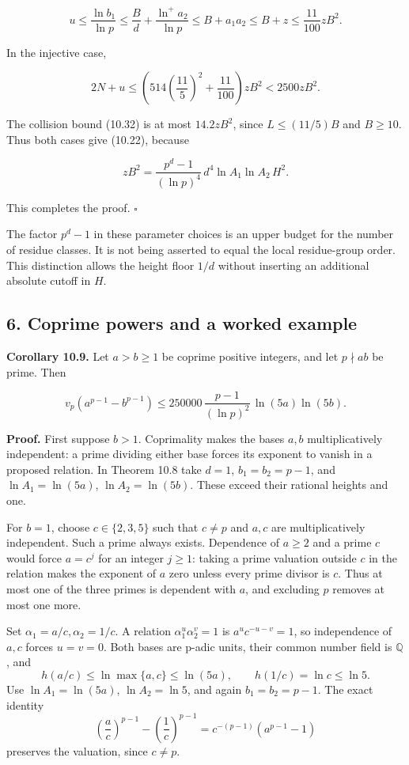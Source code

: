 \documentclass[
  11pt,
  a4paper,
]{article}
\begin{document}
\[
u\le\frac{\ln b_1}{\ln p}
\le\frac Bd+\frac{\ln^+a_2}{\ln p}
\le B+a_1a_2\le B+z
\le\frac{11}{100}zB^2.
\tag{10.33}
\]

In the injective case,

\[
2N+u\le\left(514\left(\frac{11}{5}\right)^2+\frac{11}{100}\right)zB^2
<2500zB^2.
\]

The collision bound (10.32) is at most \(14.2zB^2\), since
\(L\le(11/5)B\) and \(B\ge10\). Thus both cases give (10.22), because

\[
zB^2=\frac{p^d-1}{(\ln p)^4}\,d^4\ln A_1\ln A_2\,H^2.
\]

This completes the proof. \(\square\)

The factor \(p^d-1\) in these parameter choices is an upper budget for
the number of residue classes. It is not being asserted to equal the
local residue-group order. This distinction allows the height floor
\(1/d\) without inserting an additional absolute cutoff in \(H\).

\subsection{6. Coprime powers and a worked
example}\label{coprime-powers-and-a-worked-example}

\textbf{Corollary 10.9.} Let \(a>b\ge1\) be coprime positive integers,
and let \(p\nmid ab\) be prime. Then

\[
v_p(a^{p-1}-b^{p-1})
\le250000\,\frac{p-1}{(\ln p)^2}\,\ln(5a)\ln(5b).
\tag{10.34}
\]

\textbf{Proof.} First suppose \(b>1\). Coprimality makes the bases
\(a,b\) multiplicatively independent: a prime dividing either base
forces its exponent to vanish in a proposed relation. In Theorem 10.8
take \(d=1\), \(b_1=b_2=p-1\), and \(\ln A_1=\ln(5a)\),
\(\ln A_2=\ln(5b)\). These exceed their rational heights and one.

For \(b=1\), choose \(c\in\{2,3,5\}\) such that \(c\ne p\) and \(a,c\)
are multiplicatively independent. Such a prime always exists. Dependence
of \(a\ge2\) and a prime \(c\) would force \(a=c^j\) for an integer
\(j\ge1\): taking a prime valuation outside \(c\) in the relation makes
the exponent of \(a\) zero unless every prime divisor is \(c\). Thus at
most one of the three primes is dependent with \(a\), and excluding
\(p\) removes at most one more.

Set \(\alpha_1=a/c,\alpha_2=1/c\). A relation \(\alpha_1^u\alpha_2^v=1\)
is \(a^u c^{-u-v}=1\), so independence of \(a,c\) forces \(u=v=0\). Both
bases are p-adic units, their common number field is \(\mathbb Q\), and
\[
h(a/c)\le\ln\max\{a,c\}\le\ln(5a),\qquad
h(1/c)=\ln c\le\ln5.
\] Use \(\ln A_1=\ln(5a)\), \(\ln A_2=\ln5\), and again \(b_1=b_2=p-1\).
The exact identity \[
\left(\frac ac\right)^{p-1}
-\left(\frac1c\right)^{p-1}
=c^{-(p-1)}(a^{p-1}-1)
\] preserves the valuation, since \(c\ne p\).
\end{document}
